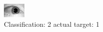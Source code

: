 \begin{figure}[h!]
\begin{center}
\includegraphics[width=0.60\columnwidth]{figures/ID1447_class_2_target_1.png}
\end{center}
\caption{ Classification: 2 actual target: 1}
\label{fig:ID1447_class_2_target_1}
\end{figure}
